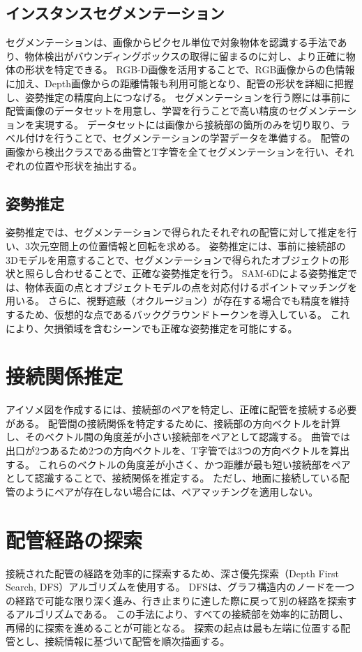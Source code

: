 \subsection{インスタンスセグメンテーション}
セグメンテーションは、画像からピクセル単位で対象物体を認識する手法であり、物体検出がバウンディングボックスの取得に留まるのに対し、より正確に物体の形状を特定できる。
RGB-D画像を活用することで、RGB画像からの色情報に加え、Depth画像からの距離情報も利用可能となり、配管の形状を詳細に把握し、姿勢推定の精度向上につなげる。
セグメンテーションを行う際には事前に配管画像のデータセットを用意し、学習を行うことで高い精度のセグメンテーションを実現する。
データセットには画像から接続部の箇所のみを切り取り、ラベル付けを行うことで、セグメンテーションの学習データを準備する。
配管の画像から検出クラスである曲管とT字管を全てセグメンテーションを行い、それぞれの位置や形状を抽出する。

\subsection{姿勢推定}
姿勢推定では、セグメンテーションで得られたそれぞれの配管に対して推定を行い、3次元空間上の位置情報と回転を求める。
姿勢推定には、事前に接続部の3Dモデルを用意することで、セグメンテーションで得られたオブジェクトの形状と照らし合わせることで、正確な姿勢推定を行う。
SAM-6Dによる姿勢推定では、物体表面の点とオブジェクトモデルの点を対応付けるポイントマッチングを用いる。
さらに、視野遮蔽（オクルージョン）が存在する場合でも精度を維持するため、仮想的な点であるバックグラウンドトークンを導入している。
これにより、欠損領域を含むシーンでも正確な姿勢推定を可能にする。



\section{接続関係推定}
アイソメ図を作成するには、接続部のペアを特定し、正確に配管を接続する必要がある。
配管間の接続関係を特定するために、接続部の方向ベクトルを計算し、そのベクトル間の角度差が小さい接続部をペアとして認識する。
曲管では出口が2つあるため2つの方向ベクトルを、T字管では3つの方向ベクトルを算出する。
これらのベクトルの角度差が小さく、かつ距離が最も短い接続部をペアとして認識することで、接続関係を推定する。
ただし、地面に接続している配管のようにペアが存在しない場合には、ペアマッチングを適用しない。

\section{配管経路の探索} 
接続された配管の経路を効率的に探索するため、深さ優先探索（Depth First Search, DFS）アルゴリズムを使用する。
DFSは、グラフ構造内のノードを一つの経路で可能な限り深く進み、行き止まりに達した際に戻って別の経路を探索するアルゴリズムである。
この手法により、すべての接続部を効率的に訪問し、再帰的に探索を進めることが可能となる。
探索の起点は最も左端に位置する配管とし、接続情報に基づいて配管を順次描画する。

